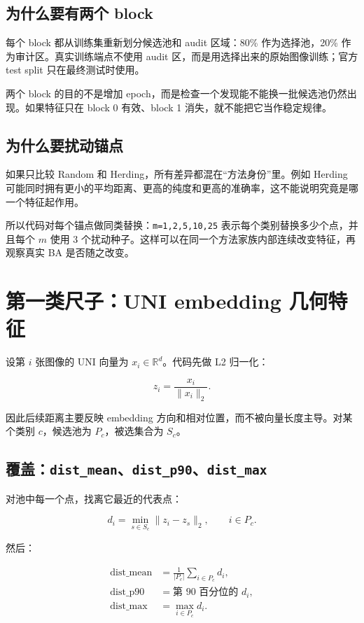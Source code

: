\documentclass[UTF8,a4paper,12pt]{ctexart}
\newcommand{\code}[1]{\texttt{#1}}
\newcommand{\R}{\mathbb{R}}
\begin{document}
\subsection{为什么要有两个 block}

每个 block 都从训练集重新划分候选池和 audit 区域：80\% 作为选择池，20\% 作为审计区。真实训练端点不使用 audit 区，而是用选择出来的原始图像训练；官方 test split 只在最终测试时使用。

两个 block 的目的不是增加 epoch，而是检查一个发现能不能换一批候选池仍然出现。如果特征只在 block 0 有效、block 1 消失，就不能把它当作稳定规律。

\subsection{为什么要扰动锚点}

如果只比较 Random 和 Herding，所有差异都混在“方法身份”里。例如 Herding 可能同时拥有更小的平均距离、更高的纯度和更高的准确率，这不能说明究竟是哪一个特征起作用。

所以代码对每个锚点做同类替换：\code{m=1,2,5,10,25} 表示每个类别替换多少个点，并且每个 \(m\) 使用 3 个扰动种子。这样可以在同一个方法家族内部连续改变特征，再观察真实 BA 是否随之改变。

\section{第一类尺子：UNI embedding 几何特征}

设第 \(i\) 张图像的 UNI 向量为 \(x_i\in\R^d\)。代码先做 L2 归一化：

\[
z_i=\frac{x_i}{\lVert x_i\rVert_2}.
\]

因此后续距离主要反映 embedding 方向和相对位置，而不被向量长度主导。对某个类别 \(c\)，候选池为 \(P_c\)，被选集合为 \(S_c\)。

\subsection{覆盖：\code{dist\_mean}、\code{dist\_p90}、\code{dist\_max}}

对池中每一个点，找离它最近的代表点：

\[
d_i=\min_{s\in S_c}\lVert z_i-z_s\rVert_2,
\qquad i\in P_c.
\]

然后：

\begin{align*}
\text{dist\_mean}&=\frac{1}{|P_c|}\sum_{i\in P_c}d_i,\\
\text{dist\_p90}&=\text{第 90 百分位的 }d_i,\\
\text{dist\_max}&=\max_{i\in P_c}d_i.
\end{align*}
\end{document}
